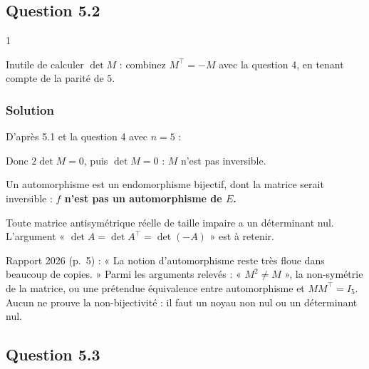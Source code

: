 \documentclass[11pt,a4paper]{article}
\newcommand{\equationajustee}[1]{%
  \sbox{\boiteequation}{$\displaystyle #1$}%
  \ifdim\wd\boiteequation>\linewidth
    \[\resizebox{\linewidth}{!}{\usebox{\boiteequation}}\]%
  \else
    \[#1\]%
  \fi}
\begin{document}
\hypertarget{question-5.2}{%
\subsection{Question 5.2}\label{question-5.2}}

\begin{indication}{1}

Inutile de calculer \(\det M\) : combinez \(M^\top=-M\) avec la question 4, en tenant compte de la parité de \(5\).

\end{indication}

\hypertarget{solution-5}{%
\subsubsection{Solution}\label{solution-5}}

D'après 5.1 et la question 4 avec \(n=5\) :

\equationajustee{\begin{aligned}
\det M&=\det(M^\top)\\
&=\det(-M)\\
&=(-1)^5\det M\\
&=-\det M.
\end{aligned}}

Donc \(2\det M=0\), puis \(\det M=0\) : \(M\) n'est pas inversible.

Un automorphisme est un endomorphisme bijectif, dont la matrice serait inversible : \textbf{\(f\) n'est pas un automorphisme de \(E\).}

\begin{methode}

Toute matrice antisymétrique réelle de taille impaire a un déterminant nul. L'argument « \(\det A=\det A^\top=\det(-A)\) » est à retenir.

\end{methode}

\begin{jury}

Rapport 2026 (p.~5) : « La notion d'automorphisme reste très floue dans beaucoup de copies. » Parmi les arguments relevés : « \(M^2\neq M\) », la non-symétrie de la matrice, ou une prétendue équivalence entre automorphisme et \(M M^\top=I_5\). Aucun ne prouve la non-bijectivité : il faut un noyau non nul ou un déterminant nul.

\end{jury}

\hypertarget{question-5.3}{%
\subsection{Question 5.3}\label{question-5.3}}
\end{document}

